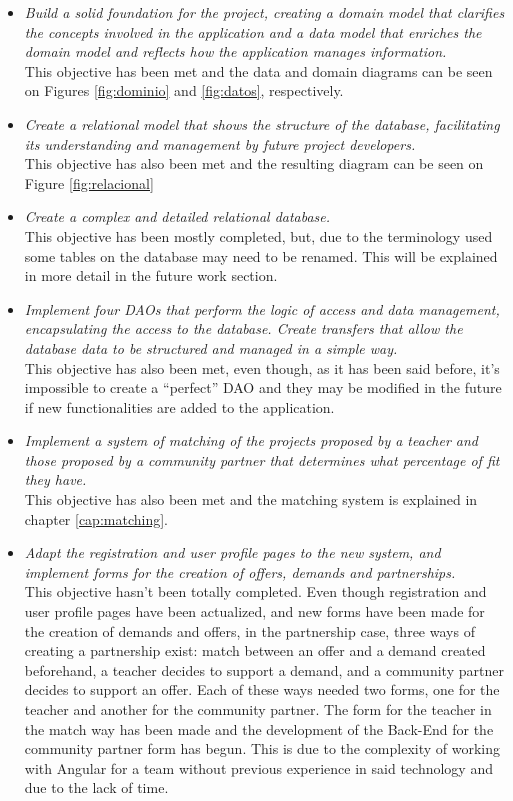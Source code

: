\documentclass[11pt]{book}
\begin{document}
	\begin{itemize}
		\item \emph{Build a solid foundation for the project, creating a domain model that clarifies the concepts involved in the application and a data model that enriches the domain model and reflects how the application manages information.}\\
		This objective has been met and the data and domain diagrams can be seen on Figures  \ref{fig:dominio} and \ref{fig:datos}, respectively.
		\item \emph{Create a relational model that shows the structure of the database, facilitating its understanding and management by future project developers.}\\
		This objective has also been met and the resulting diagram can be seen on Figure \ref{fig:relacional}
		\item \emph{Create a complex and detailed relational database.}\\
		This objective has been mostly completed, but, due to the terminology used some tables on the database may need to be renamed. This will be explained in more detail in the future work section.
		\item \emph{Implement four DAOs that perform the logic of access and data management, encapsulating the access to the database. Create transfers that allow the database data to be structured and managed in a simple way.}\\
		This objective has also been met, even though, as it has been said before, it's impossible to create a ``perfect'' DAO and they may be modified in the future if new functionalities are added to the application.
		\item \emph{Implement a system of matching of the projects proposed by a teacher and those proposed by a community partner that determines what percentage of fit they have.}\\
		This objective has also been met and the matching system is explained in chapter \ref{cap:matching}.
		\item \emph{ Adapt the registration and user profile pages to the new system, and implement forms for the creation of offers, demands and partnerships.}\\
		This objective hasn't been totally completed. Even though registration and user profile pages have been actualized, and new forms have been made for the creation of demands and offers, in the partnership case, three ways of creating a partnership exist: match between an offer and a demand created beforehand, a teacher decides to support a demand, and a community partner decides to support an offer. Each of these ways needed two forms, one for the teacher and another for the community partner. The form for the teacher in the match way has been made and the development of the Back-End for the community partner form has begun. This is due to the complexity of working with Angular for a team without previous experience in said technology and due to the lack of time.

\end{itemize}
\end{document}
